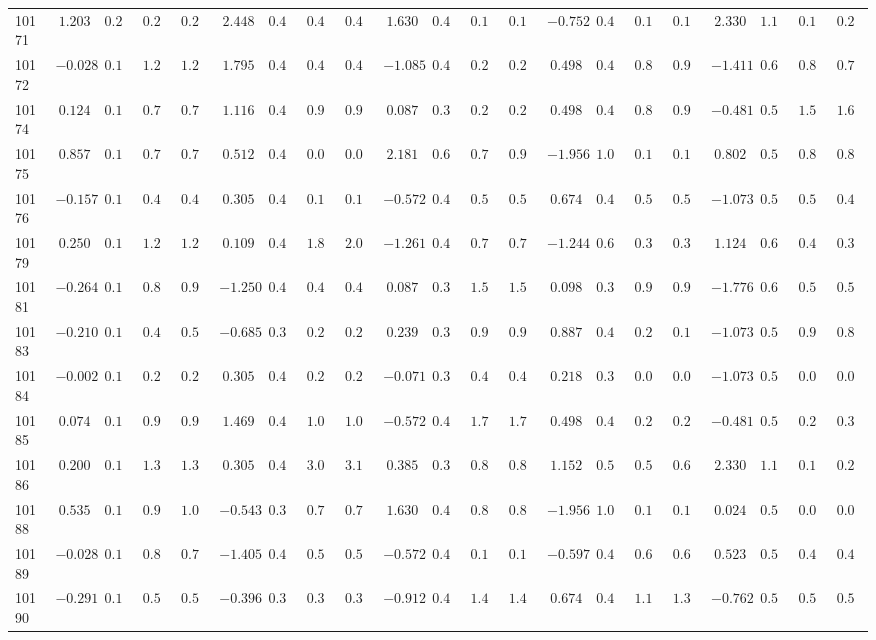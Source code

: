 \begin{landscape}
{\begin{longtable}{l|rrrr|rrrr|rrrr|rrrr|rrrr}
10171&$ 1.203$&$0.219$&$0.256$&$0.237$&$ 2.448$&$0.432$&$0.483$&$0.493$&$ 1.630$&$0.478$&$0.173$&$0.149$&$-0.752$&$0.439$&$0.195$&$0.193$&$ 2.330$&$1.198$&$0.174$&$0.222$\tabularnewline
10172&$-0.028$&$0.161$&$1.282$&$1.267$&$ 1.795$&$0.408$&$0.438$&$0.421$&$-1.085$&$0.424$&$0.263$&$0.263$&$ 0.498$&$0.411$&$0.878$&$0.972$&$-1.411$&$0.601$&$0.874$&$0.793$\tabularnewline
10174&$ 0.124$&$0.160$&$0.770$&$0.753$&$ 1.116$&$0.430$&$0.972$&$0.972$&$ 0.087$&$0.394$&$0.204$&$0.204$&$ 0.498$&$0.411$&$0.878$&$0.972$&$-0.481$&$0.528$&$1.531$&$1.646$\tabularnewline
10175&$ 0.857$&$0.183$&$0.700$&$0.702$&$ 0.512$&$0.443$&$0.056$&$0.057$&$ 2.181$&$0.619$&$0.786$&$0.940$&$-1.956$&$1.082$&$0.145$&$0.149$&$ 0.802$&$0.573$&$0.820$&$0.881$\tabularnewline
10176&$-0.157$&$0.163$&$0.439$&$0.440$&$ 0.305$&$0.437$&$0.108$&$0.111$&$-0.572$&$0.411$&$0.598$&$0.594$&$ 0.674$&$0.445$&$0.545$&$0.580$&$-1.073$&$0.572$&$0.522$&$0.488$\tabularnewline
10179&$ 0.250$&$0.160$&$1.246$&$1.264$&$ 0.109$&$0.427$&$1.898$&$2.006$&$-1.261$&$0.432$&$0.735$&$0.716$&$-1.244$&$0.630$&$0.355$&$0.367$&$ 1.124$&$0.635$&$0.419$&$0.328$\tabularnewline
10181&$-0.264$&$0.166$&$0.870$&$0.907$&$-1.250$&$0.401$&$0.482$&$0.485$&$ 0.087$&$0.394$&$1.561$&$1.586$&$ 0.098$&$0.359$&$0.958$&$0.930$&$-1.776$&$0.641$&$0.547$&$0.523$\tabularnewline
10183&$-0.210$&$0.164$&$0.492$&$0.501$&$-0.685$&$0.385$&$0.208$&$0.209$&$ 0.239$&$0.389$&$0.914$&$0.932$&$ 0.887$&$0.493$&$0.215$&$0.187$&$-1.073$&$0.572$&$0.919$&$0.864$\tabularnewline
10184&$-0.002$&$0.160$&$0.269$&$0.265$&$ 0.305$&$0.437$&$0.212$&$0.212$&$-0.071$&$0.399$&$0.426$&$0.432$&$ 0.218$&$0.370$&$0.074$&$0.071$&$-1.073$&$0.572$&$0.023$&$0.023$\tabularnewline
10185&$ 0.074$&$0.160$&$0.992$&$0.981$&$ 1.469$&$0.415$&$1.025$&$1.037$&$-0.572$&$0.411$&$1.788$&$1.777$&$ 0.498$&$0.411$&$0.292$&$0.281$&$-0.481$&$0.528$&$0.296$&$0.316$\tabularnewline
10186&$ 0.200$&$0.160$&$1.326$&$1.329$&$ 0.305$&$0.437$&$3.062$&$3.146$&$ 0.385$&$0.386$&$0.850$&$0.869$&$ 1.152$&$0.567$&$0.537$&$0.601$&$ 2.330$&$1.198$&$0.174$&$0.222$\tabularnewline
10188&$ 0.535$&$0.165$&$0.967$&$1.006$&$-0.543$&$0.389$&$0.755$&$0.787$&$ 1.630$&$0.478$&$0.878$&$0.864$&$-1.956$&$1.082$&$0.145$&$0.149$&$ 0.024$&$0.513$&$0.072$&$0.072$\tabularnewline
10189&$-0.028$&$0.161$&$0.808$&$0.797$&$-1.405$&$0.416$&$0.537$&$0.560$&$-0.572$&$0.411$&$0.191$&$0.192$&$-0.597$&$0.401$&$0.637$&$0.671$&$ 0.523$&$0.538$&$0.454$&$0.415$\tabularnewline
10190&$-0.291$&$0.166$&$0.595$&$0.593$&$-0.396$&$0.395$&$0.398$&$0.393$&$-0.912$&$0.418$&$1.482$&$1.470$&$ 0.674$&$0.445$&$1.164$&$1.371$&$-0.762$&$0.547$&$0.586$&$0.586$\tabularnewline

\end{longtable}}
\end{landscape}
